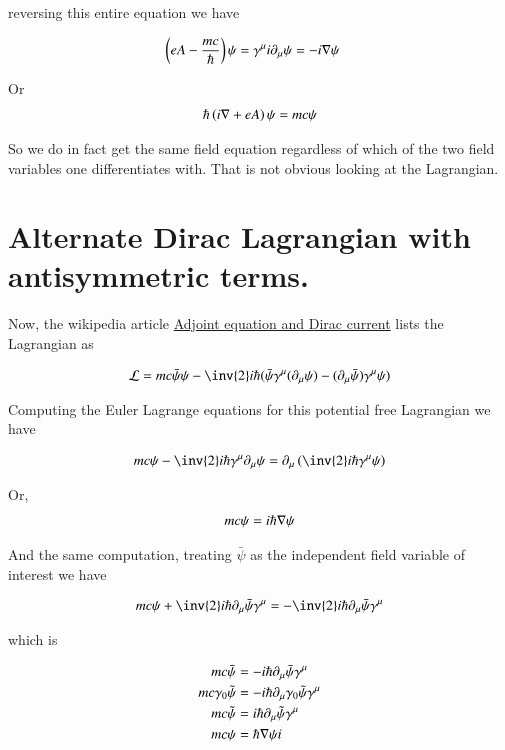 reversing this entire equation we have

\begin{align*}
\left( e A - \frac{m c}{\hbar} \right) \psi &= \gamma^\mu i \partial_\mu \psi = - i \nabla \psi
\end{align*}

Or
\begin{align*}
\hbar \left( i \nabla + e A \right) \psi = m c \psi 
\end{align*}

So we do in fact get the same field equation regardless of which of the two field variables one differentiates with.  That is not obvious looking at the Lagrangian.

\section{Alternate Dirac Lagrangian with antisymmetric terms. }

Now, the wikipedia article
\href{http://en.wikipedia.org/wiki/Dirac_equation#Adjoint_equation_and_Dirac_current}{Adjoint equation and Dirac current} lists the Lagrangian as

\begin{align*}
\LL = mc \bar{\psi}\psi - {\inv{2}i\hbar}(\bar{\psi}\gamma^\mu (\partial_\mu\psi) - (\partial_\mu\bar{\psi})\gamma^\mu \psi)
\end{align*}

Computing the Euler Lagrange equations for this potential free Lagrangian we have

\begin{align*}
m c \psi - \inv{2} i \hbar \gamma^\mu \partial_\mu \psi = \partial_\mu \left( \inv{2} i \hbar \gamma^\mu \psi \right)
\end{align*}

Or,
\begin{align*}
m c \psi = i \hbar \nabla \psi
\end{align*}

And the same computation, treating $\bar\psi$ as the independent field variable of interest we have

\begin{align*}
m c \psi + \inv{2} i \hbar \partial_\mu \bar\psi \gamma^\mu = -\inv{2} i \hbar \partial_\mu \bar\psi \gamma^\mu
\end{align*}

which is

\begin{align*}
m c \bar \psi &= - i \hbar \partial_\mu \bar\psi \gamma^\mu \\
m c \gamma_0 \tilde{\psi} &= - i \hbar \partial_\mu \gamma_0 \tilde{\psi} \gamma^\mu \\
m c \tilde{\psi} &= i \hbar \partial_\mu \tilde{\psi} \gamma^\mu \\
m c \psi &= \hbar \nabla \psi i \\
\end{align*}

